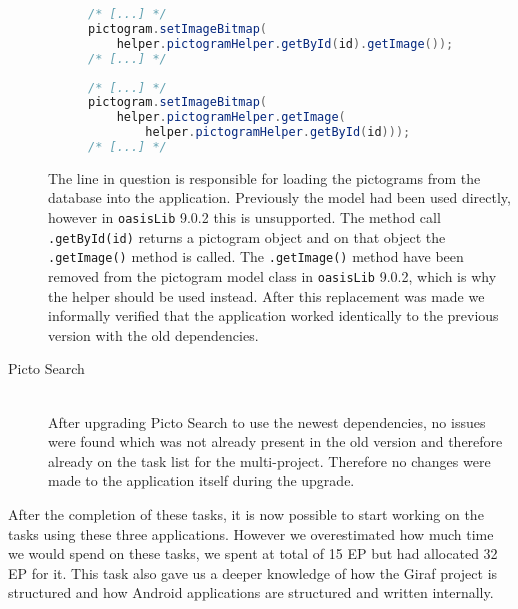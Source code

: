 \begin{description}
    \begin{figure} 
        \begin{lstlisting}[language=java, caption={Sequence with deprecated method call. }, label=lst:dep-seq-prev] 
/* [...] */ 
pictogram.setImageBitmap( 
    helper.pictogramHelper.getById(id).getImage()); 
/* [...] */ 
        \end{lstlisting} 
    \end{figure} 
    \begin{figure} 
        \begin{lstlisting}[language=java, caption={Sequence using the replacement code. }, label=lst:dep-seq-upd] 
/* [...] */ 
pictogram.setImageBitmap( 
    helper.pictogramHelper.getImage( 
        helper.pictogramHelper.getById(id))); 
/* [...] */ 
        \end{lstlisting} 
    \end{figure} 
    The line in question is responsible for loading the pictograms from the database into the application. 
    Previously the model had been used directly, however in \texttt{oasisLib} 9.0.2 this is unsupported. 
    The method call \texttt{.getById(id)} returns a pictogram object and on that object the \texttt{.getImage()} method is called. 
    The \texttt{.getImage()} method have been removed from the pictogram model class in \texttt{oasisLib} 9.0.2, which is why the helper should be used instead. 
    After this replacement was made we informally verified that the application worked identically to the previous version with the old dependencies. 
    \item[Picto Search] \hfill \\
    After upgrading Picto Search to use the newest dependencies, no issues were found which was not already present in the old version and therefore already on the task list for the multi-project. 
    Therefore no changes were made to the application itself during the upgrade. 
 \end{description}
 
 After the completion of these tasks, it is now possible to start working on the tasks using these three applications. 
 However we overestimated how much time we would spend on these tasks, we spent at total of 15 EP but had allocated 32 EP for it. 
 This task also gave us a deeper knowledge of how the Giraf project is structured and how Android applications are structured and written internally. 
